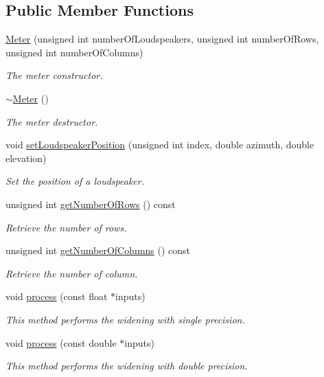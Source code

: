 \subsection*{Public Member Functions}
\begin{DoxyCompactItemize}
\item 
\hyperlink{class_hoa3_d_1_1_meter_abc40fd0b8da1e85a6a4867efeae1fcf0}{Meter} (unsigned int number\-Of\-Loudspeakers, unsigned int number\-Of\-Rows, unsigned int number\-Of\-Columns)
\begin{DoxyCompactList}\small\item\em The meter constructor. \end{DoxyCompactList}\item 
\hyperlink{class_hoa3_d_1_1_meter_a2f4d18e0007e96c1cd60e2f17d9575cc}{$\sim$\-Meter} ()
\begin{DoxyCompactList}\small\item\em The meter destructor. \end{DoxyCompactList}\item 
void \hyperlink{class_hoa3_d_1_1_meter_a150dba25119e1a6f3b59845bbb03daa7}{set\-Loudspeaker\-Position} (unsigned int index, double azimuth, double elevation)
\begin{DoxyCompactList}\small\item\em Set the position of a loudspeaker. \end{DoxyCompactList}\item 
unsigned int \hyperlink{class_hoa3_d_1_1_meter_a3ec5c6d11a62c130c4b550e32e9a5ceb}{get\-Number\-Of\-Rows} () const 
\begin{DoxyCompactList}\small\item\em Retrieve the number of rows. \end{DoxyCompactList}\item 
unsigned int \hyperlink{class_hoa3_d_1_1_meter_a9967138628278c306894ac8d5c3375c1}{get\-Number\-Of\-Columns} () const 
\begin{DoxyCompactList}\small\item\em Retrieve the number of column. \end{DoxyCompactList}\item 
void \hyperlink{class_hoa3_d_1_1_meter_a85c538e8cf9791674a9ac6e602463dd0}{process} (const float $\ast$inputs)
\begin{DoxyCompactList}\small\item\em This method performs the widening with single precision. \end{DoxyCompactList}\item 
void \hyperlink{class_hoa3_d_1_1_meter_a273685843e1059b74b6d386dfb19c53b}{process} (const double $\ast$inputs)
\begin{DoxyCompactList}\small\item\em This method performs the widening with double precision. \end{DoxyCompactList}\end{DoxyCompactItemize}


